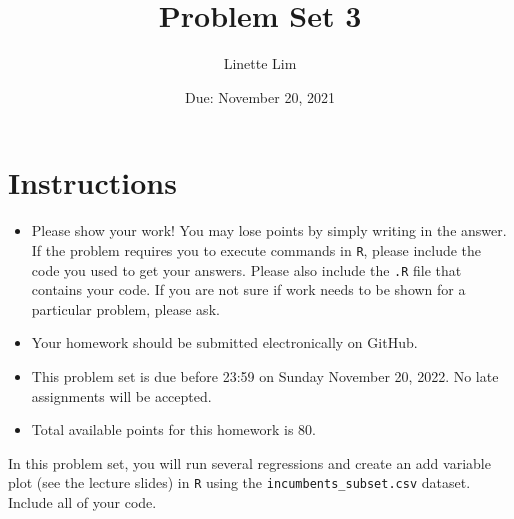 \documentclass[12pt,letterpaper]{article}
\title{Problem Set 3}
\date{Due: November 20, 2021}
\author{Linette Lim}
\begin{document}
	\maketitle
	\section*{Instructions}
	\begin{itemize}
		\item Please show your work! You may lose points by simply writing in the answer. If the problem requires you to execute commands in \texttt{R}, please include the code you used to get your answers. Please also include the \texttt{.R} file that contains your code. If you are not sure if work needs to be shown for a particular problem, please ask.
	\item Your homework should be submitted electronically on GitHub.
	\item This problem set is due before 23:59 on Sunday November 20, 2022. No late assignments will be accepted.
	\item Total available points for this homework is 80.
	\end{itemize}

		\vspace{.25cm}
	
\noindent In this problem set, you will run several regressions and create an add variable plot (see the lecture slides) in \texttt{R} using the \texttt{incumbents\_subset.csv} dataset. Include all of your code.

	\vspace{.5cm}
\end{document}
